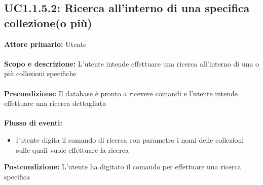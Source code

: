 \documentclass{scalatekids-article}
\begin{document}
\subsection{UC1.1.5.2: Ricerca all'interno di una specifica collezione(o più)}
\textbf{Attore primario:} Utente \\ \\
\textbf{Scopo e descrizione:} L’utente intende effettuare una ricerca all’interno di una o più collezioni specifiche\\ \\
\textbf{Precondizione:} Il database è pronto a ricevere comandi e l’utente intende effettuare una ricerca dettagliata\\ \\
\textbf{Flusso di eventi:}
\begin{itemize}
\item l’utente digita il comando di ricerca con parametro i nomi delle collezioni sulle quali vuole effettuare la ricerca
\end{itemize}
\textbf{Postcondizione:} L’utente ha digitato il comando per effettuare una ricerca specifica
\end{document}
